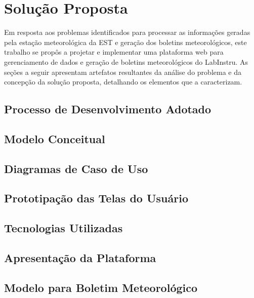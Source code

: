\chapter{Solução Proposta} \label{cap:solucao}

Em resposta aos problemas identificados para processar as informações geradas pela estação meteorológica da EST e geração dos boletins meteorológicos, este trabalho se propôs a projetar e implementar uma plataforma web para gerenciamento de dados e geração de boletins meteorológicos do LabInstru. As seções a seguir apresentam artefatos resultantes da análise do problema e da concepção da solução proposta, detalhando os elementos que a caracterizam.


\section{Processo de Desenvolvimento Adotado}


\section{Modelo Conceitual}


\section{Diagramas de Caso de Uso}


\section{Prototipação das Telas do Usuário}


\section{Tecnologias Utilizadas}


\section{Apresentação da Plataforma}


\section{Modelo para Boletim Meteorológico}

